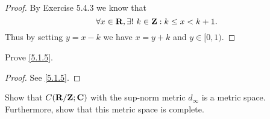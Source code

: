\begin{proof}
  By Exercise 5.4.3 we know that
  \[
    \forall x \in \mathbf{R}, \exists!\ k \in \mathbf{Z} : k \leq x < k + 1.
  \]
  Thus by setting \(y = x - k\) we have \(x = y + k\) and \(y \in [0, 1)\).
\end{proof}

\begin{exercise}\label{ex 5.1.2}
  Prove \cref{5.1.5}.
\end{exercise}

\begin{proof}
  See \cref{5.1.5}.
\end{proof}

\begin{exercise}\label{ex 5.1.3}
  Show that \(C(\mathbf{R} / \mathbf{Z} ; \mathbf{C})\) with the sup-norm metric \(d_\infty\) is a metric space.
  Furthermore, show that this metric space is complete.
\end{exercise}

